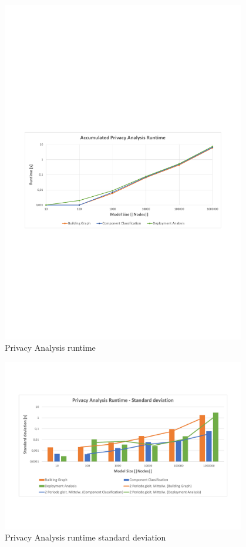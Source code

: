 \begin{figure}[h]
	\centering
	\includegraphics[trim = 15mm 95mm 13mm 110mm, clip, width=0.95\textwidth]{graphs/Runtime_pa}
	\caption{Privacy Analysis runtime}
	\label{fig:eval:pa:runtime}
\end{figure}


\begin{figure}[h]
	\centering
	\includegraphics[trim = 5mm 30mm 10mm 30mm, clip, width=0.95\textwidth]{graphs/Runtime_pa_sd}
	\caption{Privacy Analysis runtime standard deviation}
	\label{fig:eval:pa:runtime_sd}
\end{figure}


